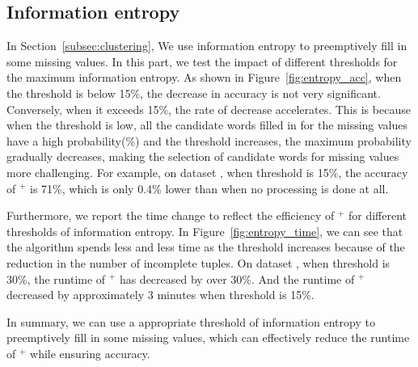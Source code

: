 \subsection{Information entropy}
\label{exp:sec:entropy}

In Section~\ref{subsec:clustering}, We use information entropy to preemptively fill in some missing values. In this part, we test the impact of different thresholds for the maximum information entropy. As shown in Figure~\ref{fig:entropy_acc}, when the threshold is below 15\%, the decrease in accuracy is not very significant. Conversely, when it exceeds 15\%, the rate of decrease accelerates. This is because when the threshold is low, all the candidate words filled in for the missing values have a high probability(\%) and the threshold increases, the maximum probability gradually decreases, making the selection of candidate words for missing values more challenging. For example, on dataset \imdbl, when threshold is 15\%, the accuracy of \ours$^+$ is 71\%, which is only 0.4\% lower than when no processing is done at all.

Furthermore, we report the time change to reflect the efficiency of \ours$^+$ for different thresholds of information entropy. In Figure~\ref{fig:entropy_time}, we can see that the algorithm spends less and less time as the threshold increases because of the reduction in the number of incomplete tuples. On dataset \imdbl, when threshold is 30\%, the runtime of \ours$^+$ has decreased by over 30\%. And the runtime of \ours$^+$ decreased by approximately 3 minutes when threshold is 15\%.



In summary, we can use a appropriate threshold of information entropy to preemptively fill in some missing values, which can effectively reduce the runtime of \ours$^+$ while ensuring accuracy. 